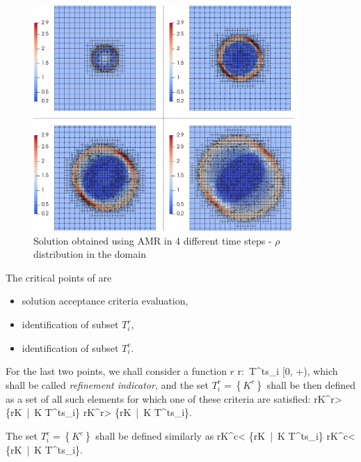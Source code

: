 \begin{figure}[H]
	\begin{center}
		\includegraphics[width=0.9\textwidth]{img/adapt/timedep/a.jpg}
		\caption{Solution obtained using AMR in 4 different time steps - $\rho$ distribution in the domain}
	\label{figure:amrTimedep}
	\end{center}
\end{figure}
\vspace{-4mm}

The critical points of  are
\begin{itemize}
\item solution acceptance criteria evaluation,
\item identification of subset $T^{r}_i$,
\item identification of subset $T^{c}_i$.
\end{itemize}
For the last two points, we shall consider a function $r$
\be
\label{refinementIndicator}
r:\ T^{ts}_i \rightarrow [0, +\infty),
\ee
which shall be called \textit{refinement indicator}, and the set $T^{r}_i = \left\{K^{r}\right\}$ shall be then defined as a set of all such elements for which one of these criteria are satisfied:
\be
	\label{refIndicatorValues}
	r\lo K^{r}\ro > \alpha \cdot \max\left\{r\lo K\ro\ |\ K \in T^{ts}_i\right\} 
\ee
\be
	r\lo K^{r}\ro > \beta \cdot \sum\left\{r\lo K\ro\ |\ K \in T^{ts}_i\right\}.
\ee

The set $T^{c}_i = \left\{K^{c}\right\}$ shall be defined similarly as
\be
	r\lo K^{c}\ro < \gamma \cdot \max\left\{r\lo K\ro\ |\ K \in T^{ts}_i\right\} 
\ee
\be
	\label{refIndicatorValuesEnd}
	r\lo K^{c}\ro < \delta \cdot \sum\left\{r\lo K\ro\ |\ K \in T^{ts}_i\right\}.
\ee

